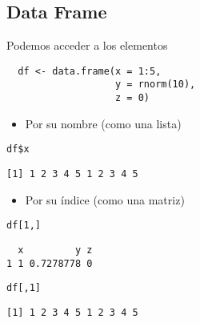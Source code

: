 \documentclass[xcolor={usenames,svgnames,dvipsnames}]{beamer}
\begin{document}
\subsection{Data Frame}
\label{sec:org069dd4f}
\begin{frame}[fragile,label={sec:org7d9824b}]{Podemos acceder a los elementos}
 \lstset{language=r,label= ,caption= ,captionpos=b,numbers=none}
\begin{lstlisting}
  df <- data.frame(x = 1:5,
                   y = rnorm(10),
                   z = 0)
\end{lstlisting}

\begin{itemize}
\item Por su nombre (como una lista)
\end{itemize}
\lstset{language=r,label= ,caption= ,captionpos=b,numbers=none}
\begin{lstlisting}
df$x
\end{lstlisting}

\begin{verbatim}
[1] 1 2 3 4 5 1 2 3 4 5
\end{verbatim}

\begin{itemize}
\item Por su índice (como una matriz)
\end{itemize}
\lstset{language=r,label= ,caption= ,captionpos=b,numbers=none}
\begin{lstlisting}
df[1,]
\end{lstlisting}

\begin{verbatim}
  x         y z
1 1 0.7278778 0
\end{verbatim}

\lstset{language=r,label= ,caption= ,captionpos=b,numbers=none}
\begin{lstlisting}
df[,1]
\end{lstlisting}

\begin{verbatim}
[1] 1 2 3 4 5 1 2 3 4 5
\end{verbatim}
\end{frame}
\end{document}
